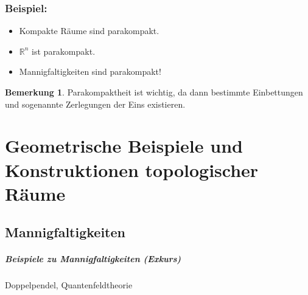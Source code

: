 \documentclass[a4paper,11pt,notitlepage]{report}
\theoremstyle{definition}
\newtheorem{remark}{Bemerkung}[chapter]
\newcommand{\R}{{\ensuremath{\mathbb{R}}}}
\newenvironment{bsp}[1]
{
\setlength{\fboxsep}{10pt}
\subsection*{Beispiel: #1}
\begin{upshape}
}
{
\end{upshape}
}
\begin{document}
\begin{bsp}{}
	 \begin{itemize}
	 	\item Kompakte Räume sind parakompakt.
	 	\item $\R^n$ ist parakompakt.
	 	\item Mannigfaltigkeiten sind parakompakt!
	 \end{itemize}
\end{bsp}

\begin{remark}{}
	Parakompaktheit ist wichtig, da dann bestimmte Einbettungen und sogenannte Zerlegungen der Eins existieren.
\end{remark}

\chapter{Geometrische Beispiele und Konstruktionen topologischer Räume}
\section{Mannigfaltigkeiten}

\paragraph{Beispiele zu Mannigfaltigkeiten (Exkurs)} Doppelpendel, Quantenfeldtheorie
\end{document}
